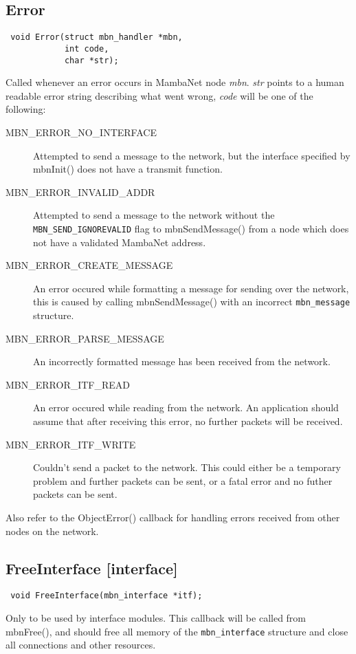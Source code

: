 \subsection{Error}
\begin{verbatim}
 void Error(struct mbn_handler *mbn,
            int code,
            char *str);
\end{verbatim}
Called whenever an error occurs in MambaNet node \textit{mbn}. \textit{str} points to a human readable error string describing what went wrong, \textit{code} will be one of the following:
\begin{description}
 \item[MBN\_ERROR\_NO\_INTERFACE]
  Attempted to send a message to the network, but the interface specified by mbnInit() does not have a transmit function.
 \item[MBN\_ERROR\_INVALID\_ADDR]
  Attempted to send a message to the network without the  \verb|MBN_SEND_IGNOREVALID| flag to mbnSendMessage() from a node which does not have a validated MambaNet address.
 \item[MBN\_ERROR\_CREATE\_MESSAGE]
  An error occured while formatting a message for sending over the network, this is caused by calling mbnSendMessage() with an incorrect \verb|mbn_message| structure.
 \item[MBN\_ERROR\_PARSE\_MESSAGE]
  An incorrectly formatted message has been received from the network.
 \item[MBN\_ERROR\_ITF\_READ]
  An error occured while reading from the network. An application should assume that after receiving this error, no further packets will be received.
 \item[MBN\_ERROR\_ITF\_WRITE]
  Couldn't send a packet to the network. This could either be a temporary problem and further packets can be sent, or a fatal error and no futher packets can be sent.
\end{description}

Also refer to the ObjectError() callback for handling errors received from other nodes on the network.


\subsection{FreeInterface \footnotesize{[interface]}}
\begin{verbatim}
 void FreeInterface(mbn_interface *itf);
\end{verbatim}
Only to be used by interface modules. This callback will be called from mbnFree(), and should free all memory of the \verb|mbn_interface| structure and close all connections and other resources.


